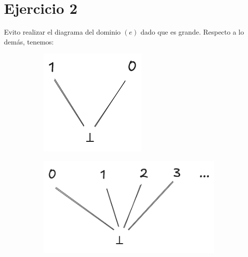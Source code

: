 \documentclass{article}
\begin{document}
\section*{Ejercicio 2}
Evito realizar el diagrama del dominio $(e)$ dado que es grande.
Respecto a lo demás, tenemos:
\begin{figure}[!htb]
	\centering
	\begin{subfigure}[b]{0.15\textwidth}
		\centering
		\includegraphics[width=\textwidth]{03-02-a.png}
		\caption{}
	\end{subfigure}
	\hfil
	\begin{subfigure}[b]{0.3\textwidth}
		\centering
		\includegraphics[width=\textwidth]{03-02-b.png}

\end{subfigure}
\end{figure}
\end{document}
